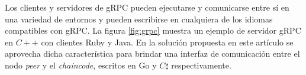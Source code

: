Los clientes y servidores de gRPC pueden ejecutarse y comunicarse entre sí en una variedad de entornos y pueden escribirse en cualquiera de los idiomas compatibles con gRPC. La figura \ref{fig:grpc} muestra un ejemplo de servidor gRPC en $ C++ $ con clientes Ruby y Java. En la solución propuesta en este artículo se aprovecha dicha característica para brindar una interfaz de comunicación entre el nodo \textit{peer} y el \textit{chaincode}, escritos en Go y $ C\sharp$ respectivamente.








